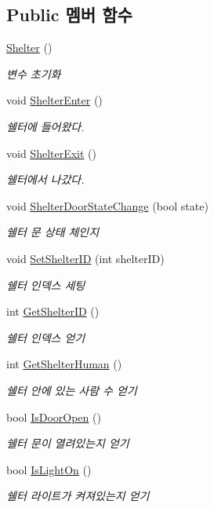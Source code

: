 \subsection*{Public 멤버 함수}
\begin{DoxyCompactItemize}
\item 
\hyperlink{class_shelter_afcd0de261925dbb0d6efe948625708b9}{Shelter} ()
\begin{DoxyCompactList}\small\item\em 변수 초기화 \end{DoxyCompactList}\item 
void \hyperlink{class_shelter_a488b5cd851099aeb8e959c1650d9cdeb}{Shelter\+Enter} ()
\begin{DoxyCompactList}\small\item\em 쉘터에 들어왔다. \end{DoxyCompactList}\item 
void \hyperlink{class_shelter_acb6d900dbdda90cdfe09aa03005e83ca}{Shelter\+Exit} ()
\begin{DoxyCompactList}\small\item\em 쉘터에서 나갔다. \end{DoxyCompactList}\item 
void \hyperlink{class_shelter_af5319d96477a916f5c589f9d3e71d618}{Shelter\+Door\+State\+Change} (bool state)
\begin{DoxyCompactList}\small\item\em 쉘터 문 상태 체인지 \end{DoxyCompactList}\item 
void \hyperlink{class_shelter_a34b27753d72d2f4e18ed9132a956e3ac}{Set\+Shelter\+ID} (int shelter\+ID)
\begin{DoxyCompactList}\small\item\em 쉘터 인덱스 세팅 \end{DoxyCompactList}\item 
int \hyperlink{class_shelter_a3c7126b39e09028cccc6af1b058d0108}{Get\+Shelter\+ID} ()
\begin{DoxyCompactList}\small\item\em 쉘터 인덱스 얻기 \end{DoxyCompactList}\item 
int \hyperlink{class_shelter_ad25c083e736fa8850a199d78c4ca753e}{Get\+Shelter\+Human} ()
\begin{DoxyCompactList}\small\item\em 쉘터 안에 있는 사람 수 얻기 \end{DoxyCompactList}\item 
bool \hyperlink{class_shelter_a3cbedf84b7e783ba45d6a5bedb97916b}{Is\+Door\+Open} ()
\begin{DoxyCompactList}\small\item\em 쉘터 문이 열려있는지 얻기 \end{DoxyCompactList}\item 
bool \hyperlink{class_shelter_a67c28ae706ebd1a9494e53cacdb5ea6e}{Is\+Light\+On} ()
\begin{DoxyCompactList}\small\item\em 쉘터 라이트가 켜져있는지 얻기 \end{DoxyCompactList}\end{DoxyCompactItemize}
